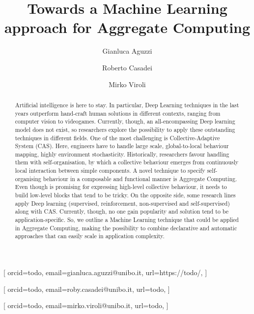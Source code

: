\documentclass[
twocolumn,
]{ceurart}
\begin{document}


\title{Towards a Machine Learning approach for Aggregate Computing} %

\author[1]{Gianluca Aguzzi}[%
orcid=todo,
email=gianluca.aguzzi@unibo.it,
url=https://todo/,
]
\author[2]{Roberto Casadei}[%
orcid=todo,
email=roby.casadei@unibo.it,
url=todo,
]
\author[2]{Mirko Viroli}[%
orcid=todo,
email=mirko.viroli@unibo.it,
url=todo,
]
\address[1]{Alma Mater Studiorum - Università di Bologna,
  Cesena, Italy}
\begin{abstract}
  Artificial intelligence is here to stay. 
  In particular, Deep Learning techniques in the last years outperform hand-craft human solutions in different contexts, ranging from computer vision to videogames.
  Currently, though, an all-encompassing Deep learning model does not exist, so researchers explore the possibility to apply these outstanding techniques in different fields.
  One of the most challenging is Collective-Adaptive System (CAS). Here, engineers have to handle large scale, global-to-local behaviour mapping,
  highly environment stochasticity. 
  Historically, researchers favour handling them with self-organisation, by which a collective behaviour emerges from continuously local interaction between simple components.
  A novel technique to specify self-organising behaviour in a composable and functional manner is Aggregate Computing. Even though is promising for expressing high-level collective behaviour, 
  it needs to build low-level blocks that tend to be tricky. 
  On the opposite side, some research lines apply Deep learning (supervised, reinforcement, non-supervised and self-supervised)
  along with CAS. Currently, though, no one gain popularity and solution tend to be application-specific.
  So, we outline a Machine Learning technique that could be applied in Aggregate Computing, making the possibility to combine declarative and automatic approaches that can easily scale in application complexity.
\end{abstract}
\end{document}
